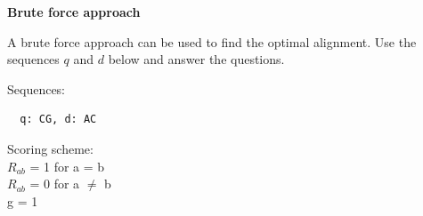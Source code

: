 \documentclass[12pt, answers]{exam}
\begin{document}
\begin{questions}
\vspace{0.1 in}


\question \textbf{Brute force approach}
  
A brute force approach can be used to find the optimal alignment. Use the sequences $q$ and $d$ below and answer the questions.

\begin{multicols}{2}
Sequences:
\begin{verbatim}
  q: CG, d: AC
\end{verbatim}
\vfill\null
\columnbreak

\noindent Scoring scheme: \\ 
\null \quad $R_{ab}$ = 1 for a = b \\ 
\null \quad $R_{ab}$ = 0 for a $\neq$ b \\ 
\null \quad g = 1

\end{multicols} 

\vspace{0.1 in}

\end{questions}
\end{document}
